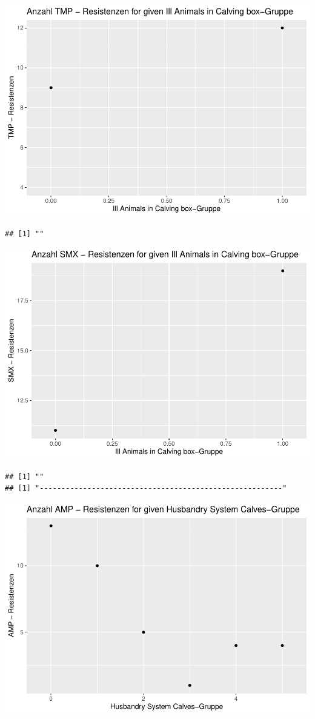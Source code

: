 \documentclass[
]{article}
\begin{document}
\includegraphics{NResistenzen_files/figure-latex/binary_or_nominal_variables-29.pdf}

\begin{verbatim}
## [1] ""
\end{verbatim}

\includegraphics{NResistenzen_files/figure-latex/binary_or_nominal_variables-30.pdf}

\begin{verbatim}
## [1] ""
## [1] "--------------------------------------------------------"
\end{verbatim}

\includegraphics{NResistenzen_files/figure-latex/binary_or_nominal_variables-31.pdf}
\end{document}
